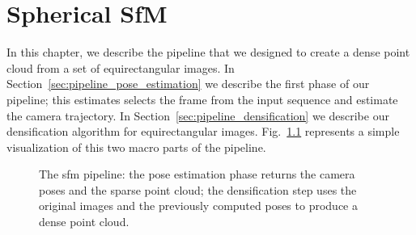 \chapter{Spherical SfM}
%
%
In this chapter, we describe the pipeline that we designed to create a dense 
point cloud from a set of equirectangular images.
In Section~\ref{sec:pipeline_pose_estimation} we describe the first phase of our
pipeline; this estimates selects the frame from the input sequence and estimate
the camera trajectory. In Section~\ref{sec:pipeline_densification} we describe 
our densification algorithm for equirectangular images.
Fig.~\ref{fig:pipeline_overview}
represents a simple visualization of this two macro parts of the 
pipeline.
\begin{figure}
    \centering
    \def\svgwidth{\columnwidth}
    
    \caption{The sfm pipeline: the pose estimation phase returns the camera 
    poses and the sparse point cloud; the densification step uses 
    the original images and the previously computed poses to produce a dense 
    point cloud.}
	\label{fig:pipeline_overview}
\end{figure}

